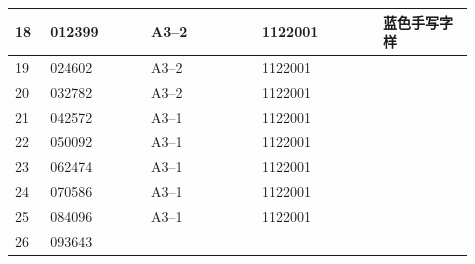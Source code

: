 \documentclass[UTF8,10pt,a4paper,fontset=fandol]{ctexart}
\newcommand{\fieldvalue}[1]{#1}
\newcommand{\handwritten}[1]{#1}
\begin{document}
\begin{tabular}{|p{0.07\linewidth}|p{0.20\linewidth}|p{0.22\linewidth}|p{0.24\linewidth}|p{0.18\linewidth}|}
\hline
18 &
\fieldvalue{012399} &
\fieldvalue{A3--2} &
\fieldvalue{1122001} &
\handwritten{蓝色手写字样}
\\
\hline
19 &
\fieldvalue{024602} &
\fieldvalue{A3--2} &
\fieldvalue{1122001} & \\
\hline
20 &
\fieldvalue{032782} &
\fieldvalue{A3--2} &
\fieldvalue{1122001} & \\
\hline
21 &
\fieldvalue{042572} &
\fieldvalue{A3--1} &
\fieldvalue{1122001} & \\
\hline
22 &
\fieldvalue{050092} &
\fieldvalue{A3--1} &
\fieldvalue{1122001} & \\
\hline
23 &
\fieldvalue{062474} &
\fieldvalue{A3--1} &
\fieldvalue{1122001} & \\
\hline
24 &
\fieldvalue{070586} &
\fieldvalue{A3--1} &
\fieldvalue{1122001} & \\
\hline
25 &
\fieldvalue{084096} &
\fieldvalue{A3--1} &
\fieldvalue{1122001} & \\
\hline
26 &
\fieldvalue{093643} &

\end{tabular}
\end{document}
